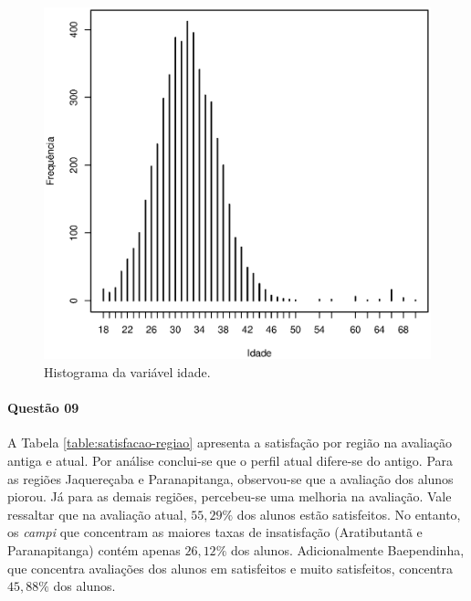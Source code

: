 \documentclass[10pt,a4paper,oneside]{article}
\newcommand{\arat}{Aratibutantã\xspace}
\newcommand{\baep}{Baependinha\xspace}
\newcommand{\jaqu}{Jaquereçaba\xspace}
\newcommand{\para}{Paranapitanga\xspace}
\begin{document}
\begin{figure}[!h]
	\centering
	\includegraphics[width=\linewidth]{plots/histogram_idade_log.eps}
	\caption{Histograma da variável idade. }
	\label{fig:histogram-idade}
\end{figure}

\FloatBarrier

\paragraph{Questão 09}

A Tabela \ref{table:satisfacao-regiao} apresenta a satisfação por região na avaliação antiga e atual. Por análise conclui-se que o perfil atual difere-se do antigo. Para as regiões \jaqu e \para, observou-se que a avaliação dos alunos piorou. Já para as demais regiões, percebeu-se uma melhoria na avaliação. Vale ressaltar que na avaliação atual, $55,29\%$ dos alunos estão satisfeitos. No entanto, os \textit{campi} que concentram as maiores taxas de insatisfação (\arat e \para) contém apenas $26,12\%$ dos alunos. Adicionalmente \baep, que concentra avaliações dos alunos em satisfeitos e muito satisfeitos, concentra $45,88\%$ dos alunos.
\end{document}
